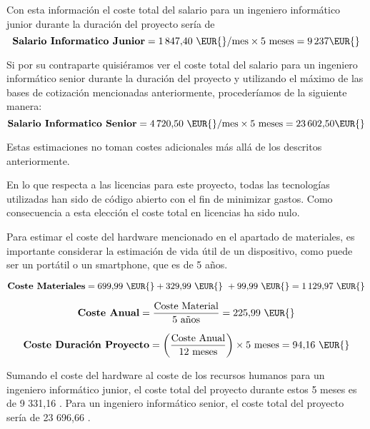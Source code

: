 Con esta información el coste total del salario para un ingeniero informático junior durante la duración del proyecto sería de
\[
    \textbf{Salario Informatico Junior} = 1\,847{,}40 \text{ \EUR{}/mes} \times 5 \text{ meses} = 9\,237 \text{\EUR{}}
\]


Si por su contraparte quisiéramos ver el coste total del salario para un ingeniero informático senior durante la duración del proyecto y utilizando el máximo de las bases de cotización mencionadas anteriormente, procederíamos de la siguiente manera:
\[
    \textbf{Salario Informatico Senior} = 4\,720{,}50 \text{ \EUR{}/mes} \times 5 \text{ meses} = 23\,602{,}50 \text{\EUR{}}
\]

Estas estimaciones no toman costes adicionales más allá de los descritos anteriormente.

En lo que respecta a las licencias para este proyecto, todas las tecnologías utilizadas han sido de código abierto con el fin de minimizar gastos. Como consecuencia a esta elección el coste total en licencias ha sido nulo.

Para estimar el coste del hardware mencionado en el apartado de materiales, es importante considerar la estimación de vida útil de un dispositivo, como puede ser un portátil o un smartphone, que es de 5 años.

\[
    \textbf{Coste Materiales} = 699{,}99 \text{ \EUR{}} + 329{,}99 \text{ \EUR{} } + 99{,}99 \text{ \EUR{}} = 1\,129{,}97 \text{ \EUR{}}
\]

\[
    \textbf{Coste Anual} = \frac{\text{Coste Material}}{5 \text{ años}} = 225{,}99 \text{ \EUR{}}
\]

\[
    \textbf{Coste Duración Proyecto} = \left( \frac{\text{Coste Anual}}{12 \text{ meses}} \right) \times 5 \text{ meses} = 94{,}16 \text{ \EUR{}}
\]

Sumando el coste del hardware al coste de los recursos humanos para un ingeniero informático junior, el coste total del proyecto durante estos 5 meses es de 9 331,16 \EUR{}. Para un ingeniero informático senior, el coste total del proyecto sería de 23 696,66 \EUR{}.


